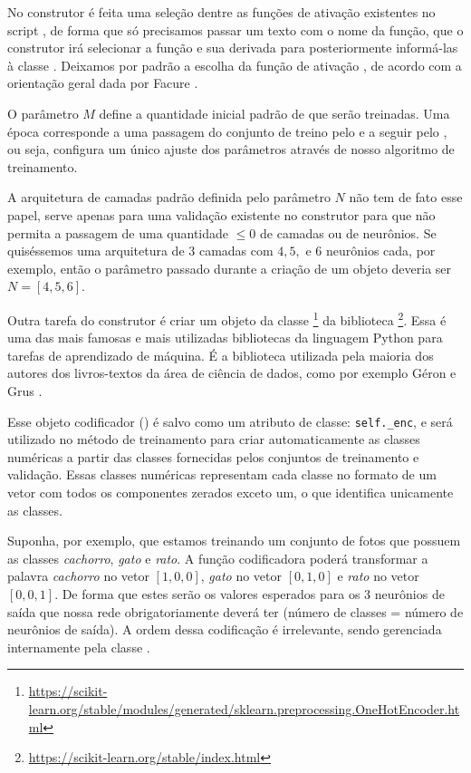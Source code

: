 No construtor é feita uma seleção dentre as funções de ativação existentes no script , de forma que só precisamos passar um texto com o nome da função, que o construtor irá selecionar a função e sua derivada para posteriormente informá-las à classe . Deixamos por padrão a escolha da função de ativação , de acordo com a orientação geral dada por Facure \citep{matheus}.

O parâmetro $M$ define a quantidade inicial padrão de  que serão treinadas. Uma época corresponde a uma passagem do conjunto de treino pelo  e a seguir pelo , ou seja, configura um único ajuste dos parâmetros através de nosso algoritmo de treinamento.

A arquitetura de camadas padrão definida pelo parâmetro $N$ não tem de fato esse papel, serve apenas para uma validação existente no construtor para que não permita a passagem de uma quantidade $\leq 0$ de camadas ou de neurônios. Se quiséssemos uma arquitetura de $3$ camadas com $4, 5, $ e $6$ neurônios cada, por exemplo, então o parâmetro passado durante a criação de um objeto  deveria ser $N = [4, 5, 6]$.

Outra tarefa do construtor é criar um objeto da classe \footnote{\url{https://scikit-learn.org/stable/modules/generated/sklearn.preprocessing.OneHotEncoder.html}} da biblioteca \footnote{\url{https://scikit-learn.org/stable/index.html}}. Essa é uma das mais famosas e mais utilizadas bibliotecas da linguagem Python para tarefas de aprendizado de máquina. É a biblioteca utilizada pela maioria dos autores dos livros-textos da área de ciência de dados, como por exemplo Géron \citep{hands} e Grus \citep{data}.

Esse objeto codificador () é salvo como um atributo de classe: \texttt{self.\_enc}, e será utilizado no método de treinamento para criar automaticamente as classes numéricas a partir das classes fornecidas pelos conjuntos de treinamento e validação. Essas classes numéricas representam cada classe no formato de um vetor com todos os componentes zerados exceto um, o que identifica unicamente as classes.

Suponha, por exemplo, que estamos treinando um conjunto de fotos que possuem as classes \emph{cachorro}, \emph{gato} e \emph{rato}. A função codificadora poderá transformar a palavra \emph{cachorro} no vetor $[1, 0, 0]$, \emph{gato} no vetor $[0, 1, 0]$ e \emph{rato} no vetor $[0, 0, 1]$. De forma que estes serão os valores esperados para os $3$ neurônios de saída que nossa rede obrigatoriamente deverá ter (número de classes = número de neurônios de saída). A ordem dessa codificação é irrelevante, sendo gerenciada internamente pela classe .


